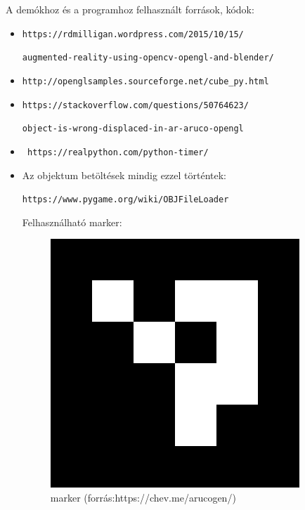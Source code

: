 A demókhoz és a programhoz felhasznált források, kódok:

\begin{itemize}
\item \texttt{https://rdmilligan.wordpress.com/2015/10/15/}

\texttt{augmented-reality-using-opencv-opengl-and-blender/}

\item \texttt{http://openglsamples.sourceforge.net/cube\_py.html }

\item \texttt{https://stackoverflow.com/questions/50764623/}


\texttt{object-is-wrong-displaced-in-ar-aruco-opengl}

\item \texttt{ https://realpython.com/python-timer/}

\item  Az objektum betöltések mindig ezzel történtek:

\texttt{https://www.pygame.org/wiki/OBJFileLoader}




Felhasználható marker: 
\begin{figure}[htp]
	\centering
	\includegraphics[scale=0.4]{images/marker.png}
	\caption{marker (forrás:https://chev.me/arucogen/)}
	\label{fig:marker}
\end{figure}



\end{itemize}
